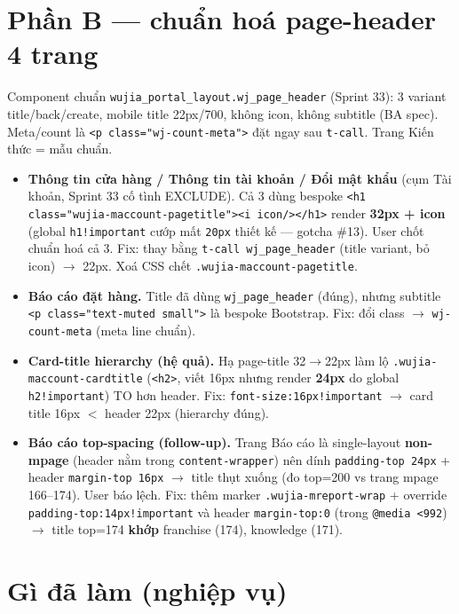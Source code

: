 \section{Phần B --- chuẩn hoá page-header 4 trang}

Component chuẩn \texttt{wujia\_portal\_layout.wj\_page\_header} (Sprint 33): 3 variant title/back/create,
mobile title 22px/700, không icon, không subtitle (BA spec). Meta/count là \texttt{<p class="wj-count-meta">}
đặt ngay sau \texttt{t-call}. Trang Kiến thức = mẫu chuẩn.

\begin{itemize}
  \item \textbf{Thông tin cửa hàng / Thông tin tài khoản / Đổi mật khẩu} (cụm Tài khoản, Sprint 33 cố tình
    EXCLUDE). Cả 3 dùng bespoke \texttt{<h1 class="wujia-maccount-pagetitle"><i icon/></h1>} render
    \textbf{32px + icon} (global \texttt{h1!important} cướp mất \texttt{20px} thiết kế --- gotcha \#13).
    User chốt chuẩn hoá cả 3. Fix: thay bằng \texttt{t-call wj\_page\_header} (title variant, bỏ icon)
    $\to$ 22px. Xoá CSS chết \texttt{.wujia-maccount-pagetitle}.
  \item \textbf{Báo cáo đặt hàng.} Title đã dùng \texttt{wj\_page\_header} (đúng), nhưng subtitle
    \texttt{<p class="text-muted small">} là bespoke Bootstrap. Fix: đổi class $\to$ \texttt{wj-count-meta}
    (meta line chuẩn).
  \item \textbf{Card-title hierarchy (hệ quả).} Hạ page-title 32$\to$22px làm lộ \texttt{.wujia-maccount-cardtitle}
    (\texttt{<h2>}, viết 16px nhưng render \textbf{24px} do global \texttt{h2!important}) TO hơn header.
    Fix: \texttt{font-size:16px!important} $\to$ card title 16px $<$ header 22px (hierarchy đúng).
  \item \textbf{Báo cáo top-spacing (follow-up).} Trang Báo cáo là single-layout \textbf{non-mpage} (header nằm
    trong \texttt{content-wrapper}) nên dính \texttt{padding-top 24px} + header \texttt{margin-top 16px}
    $\to$ title thụt xuống (đo top=200 vs trang mpage 166--174). User báo lệch. Fix: thêm marker
    \texttt{.wujia-mreport-wrap} + override \texttt{padding-top:14px!important} và header \texttt{margin-top:0}
    (trong \texttt{@media <992}) $\to$ title top=174 \textbf{khớp} franchise (174), knowledge (171).
\end{itemize}

\section{Gì đã làm (nghiệp vụ)}

